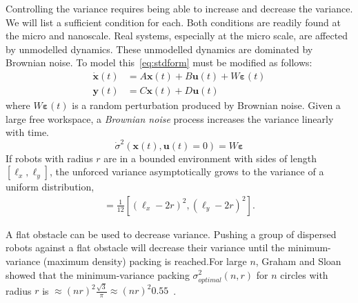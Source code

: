 Controlling the variance requires being able to increase and decrease the variance.  We will list a sufficient condition for each. Both conditions are readily found at the micro and nanoscale. 
Real systems, especially at the micro scale, are affected by unmodelled dynamics. These unmodelled dynamics are dominated by Brownian noise. To model this~\eqref{eq:stdform} must be modified as follows:
\begin{align}
\dot{\mathbf{x}}(t)  &=  A \mathbf{x}(t) + B \mathbf{u}(t) + W \bm{\varepsilon}(t)\\
 \mathbf{y}(t) &= C  \mathbf{x}(t) + D  \mathbf{u}(t)\nonumber
\end{align}
where $W\bm{\varepsilon}(t)$ is a random perturbation produced by Brownian noise. Given a large free workspace, a \emph{Brownian noise} process increases the variance linearly with time.
\begin{equation*}\dot{\sigma}^2(\mathbf{x}(t), \mathbf{u}(t) = 0)  = W \bm{\varepsilon} \end{equation*}
If robots with radius $r$ are in a bounded environment with sides of length $[\ell_x, \ell_y]$, the unforced variance asymptotically grows to the variance of a uniform distribution,
\begin{align}
[\sigma_x^2,\sigma_y^2] = \frac{1}{12}[ (\ell_x - 2 r)^2,(\ell_y - 2 r)^2].\label{eq:VarianceUniformDistribution}
\end{align}

 A flat obstacle can be used to decrease variance. Pushing a group of dispersed robots against a flat obstacle will decrease their variance until the minimum-variance (maximum density) packing  is reached.For large $n$, Graham and Sloan showed that the minimum-variance packing  $\sigma^2_{optimal}(n,r)$ for $n$ circles with radius $r$ is $\approx 
  (n r)^2 \frac{\sqrt{3}}{\pi} \approx (n r)^2 0.55$~\cite{graham1990penny}. 

